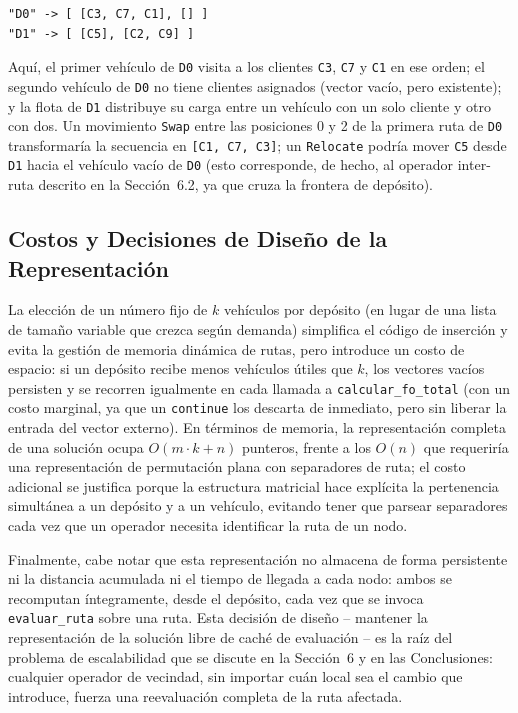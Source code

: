 \documentclass[letter, 10pt]{article}
\begin{document}
\begin{verbatim}
"D0" -> [ [C3, C7, C1], [] ]
"D1" -> [ [C5], [C2, C9] ]
\end{verbatim}

Aqu\'i, el primer veh\'iculo de \texttt{D0} visita a los clientes \texttt{C3}, \texttt{C7} y \texttt{C1} en ese orden; el segundo veh\'iculo de \texttt{D0} no tiene clientes asignados (vector vac\'io, pero existente); y la flota de \texttt{D1} distribuye su carga entre un veh\'iculo con un solo cliente y otro con dos. Un movimiento \texttt{Swap} entre las posiciones 0 y 2 de la primera ruta de \texttt{D0} transformar\'ia la secuencia en \texttt{[C1, C7, C3]}; un \texttt{Relocate} podr\'ia mover \texttt{C5} desde \texttt{D1} hacia el veh\'iculo vac\'io de \texttt{D0} (esto corresponde, de hecho, al operador inter-ruta descrito en la Secci\'on~6.2, ya que cruza la frontera de dep\'osito).

\subsection{Costos y Decisiones de Dise\~no de la Representaci\'on}

La elecci\'on de un n\'umero fijo de $k$ veh\'iculos por dep\'osito (en lugar de una lista de tama\~no variable que crezca seg\'un demanda) simplifica el c\'odigo de inserci\'on y evita la gesti\'on de memoria din\'amica de rutas, pero introduce un costo de espacio: si un dep\'osito recibe menos veh\'iculos \'utiles que $k$, los vectores vac\'ios persisten y se recorren igualmente en cada llamada a \texttt{calcular\_fo\_total} (con un costo marginal, ya que un \texttt{continue} los descarta de inmediato, pero sin liberar la entrada del vector externo). En t\'erminos de memoria, la representaci\'on completa de una soluci\'on ocupa $O(m \cdot k + n)$ punteros, frente a los $O(n)$ que requerir\'ia una representaci\'on de permutaci\'on plana con separadores de ruta; el costo adicional se justifica porque la estructura matricial hace expl\'icita la pertenencia simult\'anea a un dep\'osito y a un veh\'iculo, evitando tener que parsear separadores cada vez que un operador necesita identificar la ruta de un nodo.

Finalmente, cabe notar que esta representaci\'on no almacena de forma persistente ni la distancia acumulada ni el tiempo de llegada a cada nodo: ambos se recomputan \'integramente, desde el dep\'osito, cada vez que se invoca \texttt{evaluar\_ruta} sobre una ruta. Esta decisi\'on de dise\~no -- mantener la representaci\'on de la soluci\'on libre de cach\'e de evaluaci\'on -- es la ra\'iz del problema de escalabilidad que se discute en la Secci\'on~6 y en las Conclusiones: cualquier operador de vecindad, sin importar cu\'an local sea el cambio que introduce, fuerza una reevaluaci\'on completa de la ruta afectada.
\end{document}
